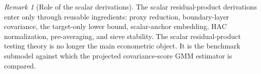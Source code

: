\documentclass[11pt,a4paper]{amsart}
\theoremstyle{plain}
\theoremstyle{definition}
\theoremstyle{remark}
\newtheorem{remark}[theorem]{Remark}
\begin{document}
\begin{remark}[Role of the scalar derivations]
The scalar residual-product derivations enter only through reusable ingredients: proxy reduction,
boundary-layer covariance, the target-only lower bound, scalar-anchor embedding, HAC normalization,
pre-averaging, and sieve stability.  The scalar residual-product testing theory is no longer the
main econometric object.  It is the benchmark submodel against which the projected covariance-score
GMM estimator is compared.
\end{remark}



\end{document}
